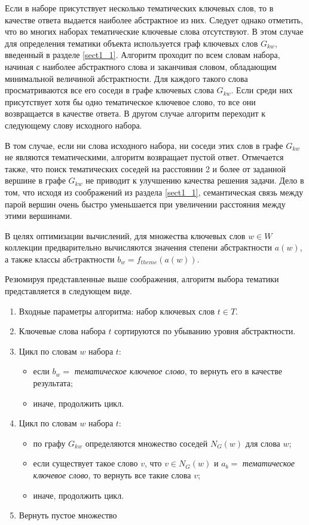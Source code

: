 Если в наборе присутствует несколько тематических ключевых слов, то в качестве ответа выдается наиболее абстрактное из них. Следует однако отметить, что во многих наборах тематические ключевые слова отсутствуют. В этом случае для определения тематики объекта используется граф ключевых слов $G_{kw}$, введенный в разделе \ref{sect1_1}. Алгоритм проходит по всем словам набора, начиная с наиболее абстрактного слова и заканчивая словом, обладающим минимальной величиной абстрактности. Для каждого такого слова просматриваются все его соседи в графе ключевых слова $G_{kw}$. Если среди них присутствует хотя бы одно тематическое ключевое слово, то все они возвращается в качестве ответа. В другом случае алгоритм переходит к следующему слову исходного набора.

В том случае, если ни слова исходного набора, ни соседи этих слов в графе $G_{kw}$ не являются тематическими, алгоритм возвращает пустой ответ. Отмечается также, что поиск тематических соседей на расстоянии 2 и более от заданной вершине в графе $G_{kw}$ не приводит к улучшению качества решения задачи. Дело в том, что исходя из соображений из раздела \ref{sect1_1}, семантическая связь между парой вершин очень быстро уменьшается при увеличении расстояния между этими вершинами.

В целях оптимизации вычислений, для множества ключевых слов $w \in W$ коллекции предварительно вычисляются значения степени абстрактности $a(w)$, а также классы абcтрактности $b_w = f_{theme}(a(w))$.

Резюмируя представленные выше соображения, алгоритм выбора тематики представляется в следующем виде.
\begin{enumerate}
    \item Входные параметры алгоритма: набор ключевых слов $t \in T$.
    \item Ключевые слова набора $t$ сортируются по убыванию уровня абстрактности.
    \item Цикл по словам $w$ набора $t$:
        \begin{itemize}
            \item если $b_w = $ \emph{тематическое ключевое слово}, то вернуть его в качестве результата;
            \item иначе, продолжить цикл.
        \end{itemize}
    \item Цикл по словам $w$ набора $t$:
        \begin{itemize}
            \item по графу $G_{kw}$ определяются множество соседей $N_G(w)$ для слова $w$;
            \item если существует такое слово $v$, что $v \in N_G(w)$ и $a_b = $ \emph{тематическое ключевое слово}, то вернуть все такие слова $v$;
            \item иначе, продолжить цикл.
        \end{itemize}
    \item Вернуть пустое множество
\end{enumerate}


